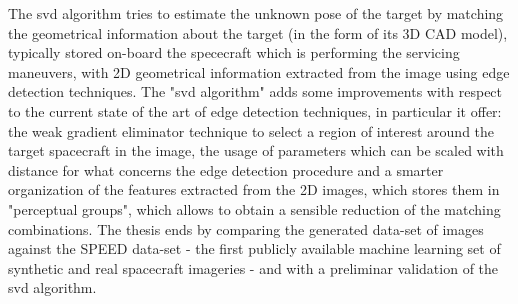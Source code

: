 The \acrshort{svd} algorithm tries to estimate the unknown pose of the target by matching the geometrical information about the target (in the form of its 3D CAD model), typically stored on-board the spececraft which is performing the servicing maneuvers, with 2D geometrical information extracted from the image using edge detection techniques. The "\acrshort{svd} algorithm" adds some improvements with respect to the current state of the art of edge detection techniques, in particular it offer: the weak gradient eliminator technique to select a region of interest around the target spacecraft in the image, the usage of parameters which can be scaled with distance for what concerns the edge detection procedure and a smarter organization of the features extracted from the 2D images, which stores them in "perceptual groups", which allows to obtain a sensible reduction of the matching combinations. The thesis ends by comparing the generated data-set of images against the SPEED data-set - the first publicly available machine learning set of synthetic and real spacecraft imageries - and with a preliminar validation of the \acrshort{svd} algorithm.